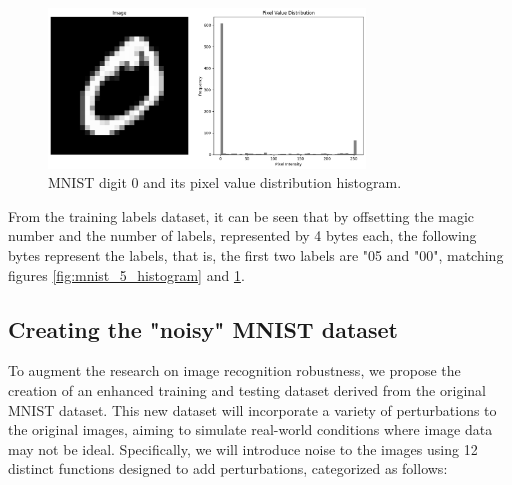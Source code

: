 \begin{figure}[h]
    \centering
    \includegraphics[width=0.75\textwidth]{Figures/Methods/MNIST_0_with_histogram.png}
    \caption{MNIST digit 0 and its pixel value distribution histogram.}
    \label{fig:mnist_0_histogram}
\end{figure}

From the training labels dataset, it can be seen that by offsetting the magic number and the number of labels, represented by 4 bytes each, the following bytes represent the labels, that is, the first two labels are "05 and "00", matching figures \ref{fig:mnist_5_histogram} and \ref{fig:mnist_0_histogram}.

\subsection{Creating the "noisy" MNIST dataset}

To augment the research on image recognition robustness, we propose the creation of an enhanced training and testing dataset derived from the original MNIST dataset. This new dataset will incorporate a variety of perturbations to the original images, aiming to simulate real-world conditions where image data may not be ideal. Specifically, we will introduce noise to the images using 12 distinct functions designed to add perturbations, categorized as follows:

